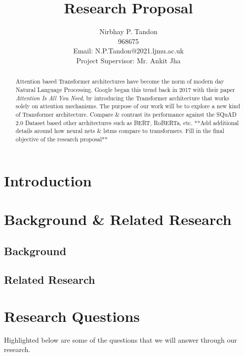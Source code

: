 \documentclass[11pt]{article}
\begin{document}
\title{Research Proposal}

\author{Nirbhay P. Tandon\\968675\\Email: N.P.Tandon@2021.ljmu.ac.uk\\
Project Supervisor: Mr. Ankit Jha
}
\date{}
\maketitle


\begin{abstract}
Attention based Transformer architectures have become the norm of modern day Natural Language Processing. Google began this trend back in 2017 with their paper \textit{Attention Is All You Need}\cite{atayl}, by introducing the Transformer architecture that works solely on attention mechanisms. The purpose of our work will be to explore a new kind of Transformer architecture. Compare \& contrast its performance against the SQuAD 2.0 Dataset\cite{dataset} based other architectures such as BERT\cite{bert}, RoBERTa\cite{roberta}, etc. **Add additional details around how neural nets \& lstms compare to transformers. Fill in the final objective of the research proposal**
\end{abstract}
\newpage
\tableofcontents
\newpage
\section{Introduction}\label{Introduction}

\section{Background \& Related Research}\label{Section-Frameworks}

\subsection{Background}
\subsection{Related Research}

\newpage
\section{Research Questions}\label{Section-Conclusions}
Highlighted below are some of the questions that we will answer through our research.
\end{document}
